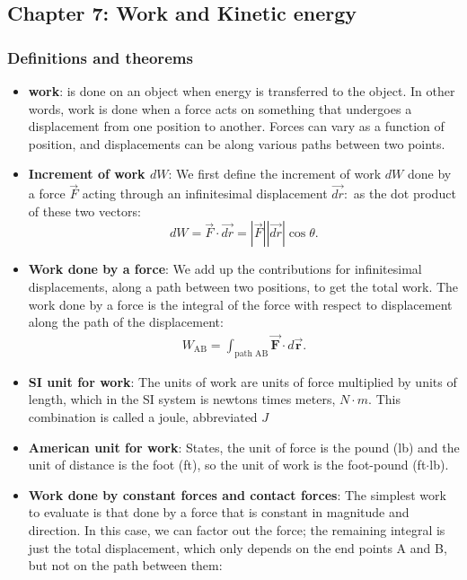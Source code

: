 \documentclass{report}
\begin{document}
    \pagebreak 
    \subsection{Chapter 7: Work and Kinetic energy}
    \bigbreak \noindent 
    \subsubsection{Definitions and theorems}
    \begin{itemize}
        \item \textbf{work}: is done on an object when energy is transferred to the object. In other words, work is done when a force acts on something that undergoes a displacement from one position to another. Forces can vary as a function of position, and displacements can be along various paths between two points. 
        \item \textbf{Increment of work $dW$}: We first define the increment of work $dW$ done by a force $\vec{F}$ acting through an infinitesimal displacement $\vec{dr}:$ as the dot product of these two vectors:
            \begin{equation}
                dW = \vec{F} \cdot \vec{dr} = \left|\vec{F}\right| \left|\vec{dr}\right| \cos\theta.
            \end{equation}
        \item \textbf{Work done by a force}:
            We  add up the contributions for infinitesimal displacements, along a path between two positions, to get the total work.
            \bigbreak \noindent 
            The work done by a force is the integral of the force with respect to displacement along the path of the displacement:
            \begin{align*}
                W_{\text{AB}} = \int_{\text{path AB}} \vec{\mathbf{F}} \cdot d \vec{\mathbf{r}}
            .\end{align*}
        \item \textbf{SI unit for work}: The units of work are units of force multiplied by units of length, which in the SI system is newtons times meters, $N\cdot m$. This combination is called a joule, abbreviated $J$
        \item \textbf{American unit for work}: States, the unit of force is the pound (lb) and the unit of distance is the foot (ft), so the unit of work is the foot-pound  (ft$\cdot$lb).
        \item \textbf{Work done by constant forces and contact forces}: The simplest work to evaluate is that done by a force that is constant in magnitude and direction. In this case, we can factor out the force; the remaining integral is just the total displacement, which only depends on the end points A and B, but not on the path between them:

\end{itemize}
\end{document}
